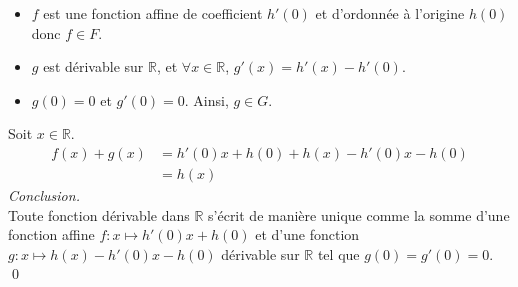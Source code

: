 \documentclass[10pt]{article}
\begin{document}
\begin{tcolorbox}[enhanced, width=7in, center, size=fbox, fontupper=\large, drop shadow southwest]
\begin{equation*}
    \end{equation*}
    \begin{itemize}
        \item $f$ est une fonction affine de coefficient $h'(0)$ et d'ordonnée à l'origine $h(0)$ donc $f\in F$.
        \item $g$ est dérivable sur $\mathbb{R}$, et $\forall{x\in\mathbb{R}}$, $g'(x)=h'(x)-h'(0)$.
        \item $g(0)=0$ et $g'(0)=0$. Ainsi, $g\in G$.
    \end{itemize}
    Soit $x\in\mathbb{R}$.
    \begin{align*}
        f(x) + g(x) 
        &= h'(0)x + h(0) + h(x) - h'(0)x - h(0)\\
        &= h(x)
    \end{align*}
    \emph{Conclusion.}\\
    Toute fonction dérivable dans $\mathbb{R}$ s'écrit de manière unique comme la somme d'une fonction affine $f:x\mapsto h'(0)x+h(0)$ et d'une fonction $g:x\mapsto h(x)-h'(0)x-h(0)$ dérivable sur $\mathbb{R}$ tel que $g(0)=g'(0)=0$.\\
    \qed
\end{tcolorbox}
\end{document}
